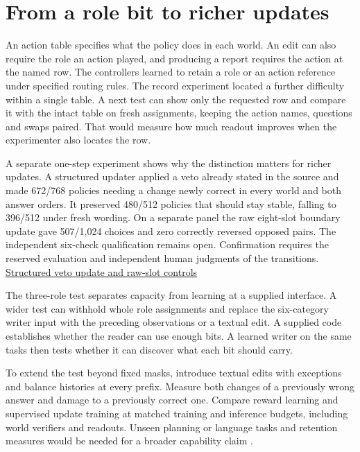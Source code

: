 \documentclass[11pt]{article}
\begin{document}
\section{From a role bit to richer updates}

An action table specifies what the policy does in each world. An edit can also require the role an action played, and producing a report requires the action at the named row. The controllers learned to retain a role or an action reference under specified routing rules. The record experiment located a further difficulty within a single table. A next test can show only the requested row and compare it with the intact table on fresh assignments, keeping the action names, questions and swaps paired. That would measure how much readout improves when the experimenter also locates the row.

A separate one-step experiment shows why the distinction matters for richer updates. A structured updater applied a veto already stated in the source and made 672/768 policies needing a change newly correct in every world and both answer orders. It preserved 480/512 policies that should stay stable, falling to 396/512 under fresh wording. On a separate panel the raw eight-slot boundary update gave 507/1,024 choices and zero correctly reversed opposed pairs. The independent six-check qualification remains open. Confirmation requires the reserved evaluation and independent human judgments of the transitions. \href{https://github.com/RyoSpiralArchitect/self-fold/blob/6cfa48a58b9dcb9693f10dfba7f14d6a9c248433/provenance/supported_g_20261104/RESULTS.md}{Structured veto update and raw-slot controls}

The three-role test separates capacity from learning at a supplied interface. A wider test can withhold whole role assignments and replace the six-category writer input with the preceding observations or a textual edit. A supplied code establishes whether the reader can use enough bits. A learned writer on the same tasks then tests whether it can discover what each bit should carry.

To extend the test beyond fixed masks, introduce textual edits with exceptions and balance histories at every prefix. Measure both changes of a previously wrong answer and damage to a previously correct one. Compare reward learning and supervised update training at matched training and inference budgets, including world verifiers and readouts. Unseen planning or language tasks and retention measures would be needed for a broader capability claim \citep{kumar2024score,gao2022overoptimization}.
\end{document}
